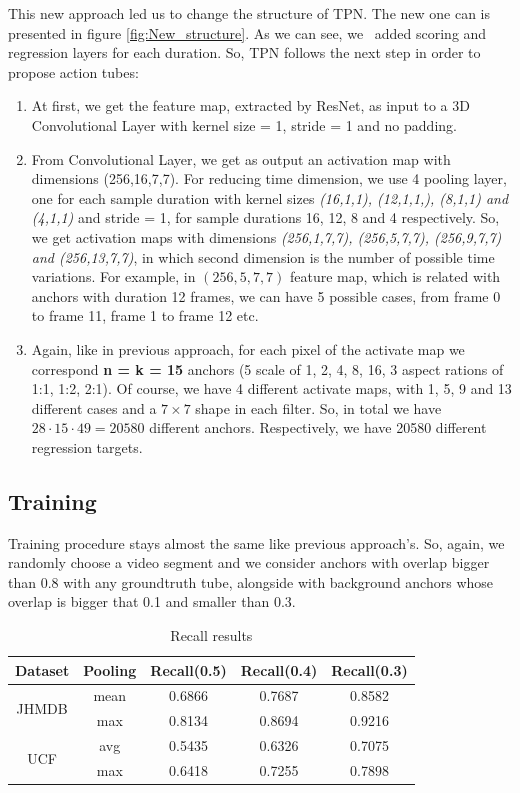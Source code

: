 \documentclass{report}
\begin{document}
This new approach led us to change the structure of TPN. The new one can is presented in figure \ref{fig:New_structure}. As we can see, we \
added scoring and regression layers for each duration. So, TPN follows the next step in order to propose action tubes:
\begin{enumerate}
\item At first, we get the feature map, extracted by ResNet, as input to a 3D Convolutional Layer with kernel size = 1, stride = 1 and no padding.
\item From Convolutional Layer, we get as output an activation map with dimensions (256,16,7,7). For reducing time dimension, we use 4 pooling layer,
  one for each sample duration with kernel sizes \textit{(16,1,1), (12,1,1,), (8,1,1) and (4,1,1)} and stride = 1,  for sample durations 16, 12, 8 and 4 respectively.
  So, we get activation maps with dimensions \textit{(256,1,7,7), (256,5,7,7), (256,9,7,7) and (256,13,7,7)}, in which second dimension is the number of possible
  time variations. For example, in $(256,5,7,7)$ feature map, which is related with anchors with duration 12 frames, we can have 5 possible cases, from frame 0 to frame
  11, frame 1 to frame 12 etc.
  
\item Again, like in previous approach, for each pixel of the activate map we correspond \textbf{n = k = 15}
  anchors (5 scale of 1, 2, 4, 8, 16, 3 aspect rations of  1:1, 1:2, 2:1). Of course, we have 4 different activate maps, with 1, 5, 9 and 13
  different cases and a $7 \times 7$ shape in each filter. So, in total we have $28 \cdot 15 \cdot 49 = 20580$ different anchors.
  Respectively, we have 20580 different regression targets.

\end{enumerate}

\subsection{Training}
Training procedure stays almost the same like previous approach's. So, again, we randomly choose  a video segment and we consider anchors with overlap bigger than 0.8 with any groundtruth
tube, alongside with background anchors whose overlap is bigger that 0.1 and smaller than 0.3.

\begin{table}[h]
  \centering
  \begin{tabular}{||c | c || c  c c||}
    \hline
    \textbf{Dataset} & \textbf{Pooling} &  \textbf{Recall(0.5)} & \textbf{Recall(0.4)} & \textbf{Recall(0.3)} \\
    \hline  \hline
    \multirow{2}{4em}{JHMDB} & mean & 0.6866 & 0.7687 & 0.8582 \\
    \cline{2-5}
    {} & max &  0.8134 & 0.8694 & 0.9216 \\
    \hline
    \multirow{2}{4em}{UCF} & avg &  0.5435 & 0.6326 & 0.7075 \\
    \cline{2-5}
    {} & max & 0.6418 & 0.7255 & 0.7898 \\
    \hline
  \end{tabular}
  \caption{Recall results}
  \label{table:tpn_2_1}
\end{table}
\end{document}

